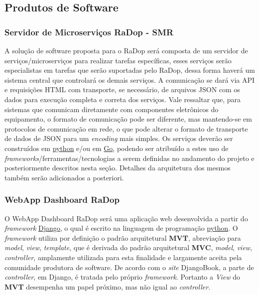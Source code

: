 \subsection{Produtos de Software}\label{produtos-de-software}

\subsubsection{Servidor de Microserviços RaDop - SMR}\label{servidor-de-microservicos-radop---smr}

A solução de software proposta para o RaDop será composta de um servidor
de serviços/microserviços para realizar tarefas específicas, esses
serviços serão especialistas em tarefas que serão suportadas pelo RaDop,
dessa forma haverá um sistema central que controlará os demais serviços.
A comunicação se dará via API e requisições HTML com transporte, se
necessário, de arquivos JSON com os dados para execução completa e
correta dos serviços. Vale ressaltar que, para sistemas que comunicam
diretamente com componentes eletrônicos do equipamento, o formato de
comunicação pode ser diferente, mas mantendo-se em protocolos de
comunicação em rede, o que pode alterar o formato de transporte de dados
de JSON para um \emph{encoding} mais simples. Os serviços deverão ser
construídos em \href{https://www.python.org/}{python} e/ou em
\href{https://golang.org/}{Go}, podendo ser atribuído a estes uso de
\emph{frameworks}/ferramentas/tecnologias a serem definidas no andamento
do projeto e posteriormente descritos nesta seção. Detalhes da
arquitetura dos mesmos também serão adicionados a posteriori.

\subsubsection{WebApp Dashboard RaDop}\label{webapp-dashboard-radop}

O WebApp Dashboard RaDop será uma aplicação web desenvolvida a partir do
\emph{framework} \href{https://www.djangoproject.com/}{Django}, o qual é
escrito na linguagem de programação
\href{https://www.python.org/}{python}. O \emph{framework} utiliza por
definição o padrão arquitetural \textbf{MVT}, abreviação para
\emph{model}, \emph{view}, \emph{template}, que é derivada do padrão
arquitetural \textbf{MVC}, \emph{model}, \emph{view}, \emph{controller},
amplamente utilizada para esta finalidade e largamente aceita pela
comunidade produtora de software. De acordo com o \emph{site}
DjangoBook, a parte de \emph{controller}, em Django, é tratada pelo
próprio \emph{framework}. Portanto a \emph{View} do \textbf{MVT}
desempenha um papel próximo, mas não igual ao \emph{controller}.

